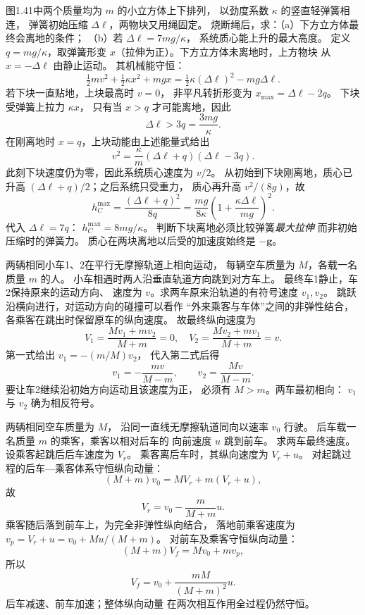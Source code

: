 图1.41中两个质量均为 $m$ 的小立方体上下排列，
以劲度系数 $\kappa$ 的竖直轻弹簧相连，
弹簧初始压缩 $\Delta\ell$，两物块又用绳固定。
烧断绳后，求：（a）下方立方体最终会离地的条件；
（b）若 $\Delta\ell=7mg/\kappa$，
系统质心能上升的最大高度。
\exsolution
定义 $q=mg/\kappa$，取弹簧形变
$x$（拉伸为正）。下方立方体未离地时，上方物块
从 $x=-\Delta\ell$ 由静止运动。
其机械能守恒：
\[
\tfrac12mv^2+\tfrac12\kappa x^2+mgx
=\tfrac12\kappa(\Delta\ell)^2-mg\Delta\ell.
\]
若下块一直贴地，上块最高时 $v=0$，
非平凡转折形变为
$x_{\max}=\Delta\ell-2q$。
下块受弹簧上拉力 $\kappa x$，
只有当 $x>q$ 才可能离地，因此
\[
\boxed{\Delta\ell>3q=\frac{3mg}{\kappa}}.
\]
在刚离地时 $x=q$，上块动能由上述能量式给出
\[
v^2=\frac{\kappa}{m}(\Delta\ell+q)(\Delta\ell-3q).
\]
此刻下块速度仍为零，因此系统质心速度为 $v/2$。
从初始到下块刚离地，质心已升高
$(\Delta\ell+q)/2$；之后系统只受重力，
质心再升高 $v^2/(8g)$，故
\[
\boxed{h_C^{\max}=
\frac{(\Delta\ell+q)^2}{8q}
=\frac{mg}{8\kappa}
\left(1+\frac{\kappa\Delta\ell}{mg}\right)^2}.
\]
代入 $\Delta\ell=7q$：
$\boxed{h_C^{\max}=8mg/\kappa}$。
\excheck 判断下块离地必须比较弹簧\emph{最大拉伸}
而非初始压缩时的弹簧力。
质心在两块离地以后受的加速度始终是 $-\bm g$。

两辆相同小车1、2在平行无摩擦轨道上相向运动，
每辆空车质量为 $M$，各载一名质量 $m$ 的人。
小车相遇时两人沿垂直轨道方向跳到对方车上。
最终车1静止，车2保持原来的运动方向、
速度为 $v$。求两车原来沿轨道的有符号速度 $v_1,v_2$。
\exsolution
跳跃沿横向进行，对运动方向的碰撞可以看作
“外来乘客与车体”之间的非弹性结合，
各乘客在跳出时保留原车的纵向速度。
故最终纵向速度为
\[
V_1=\frac{Mv_1+mv_2}{M+m}=0,\quad
V_2=\frac{Mv_2+mv_1}{M+m}=v.
\]
第一式给出 $v_1=-(m/M)v_2$，
代入第二式后得
\[
\boxed{v_1=-\frac{mv}{M-m},\qquad
v_2=\frac{Mv}{M-m}}.
\]
\excheck 要让车2继续沿初始方向运动且该速度为正，
必须有 $M>m$。两车最初相向：
$v_1$ 与 $v_2$ 确为相反符号。

两辆相同空车质量为 $M$，
沿同一直线无摩擦轨道同向以速率 $v_0$ 行驶。
后车载一名质量 $m$ 的乘客，乘客以相对后车的
向前速度 $u$ 跳到前车。
求两车最终速度。
\exsolution
设乘客起跳后后车速度为 $V_r$。
乘客离后车时，其纵向速度为 $V_r+u$。
对起跳过程的后车—乘客体系守恒纵向动量：
\[
(M+m)v_0=MV_r+m(V_r+u),
\]
故
\[
\boxed{V_r=v_0-\frac{m}{M+m}u}.
\]
乘客随后落到前车上，为完全非弹性纵向结合，
落地前乘客速度为
$v_p=V_r+u=v_0+Mu/(M+m)$。
对前车及乘客守恒纵向动量：
\[
(M+m)V_f=Mv_0+mv_p,
\]
所以
\[
\boxed{V_f=v_0+\frac{mM}{(M+m)^2}u}.
\]
\excheck 后车减速、前车加速；整体纵向动量
在两次相互作用全过程仍然守恒。

